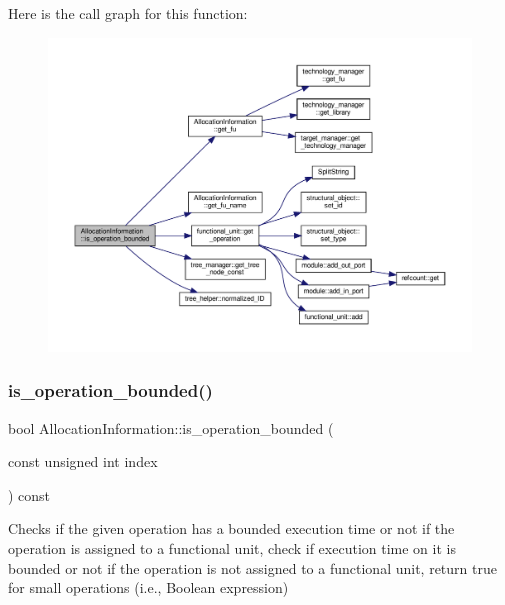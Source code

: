 Here is the call graph for this function\+:
\nopagebreak
\begin{figure}[H]
\begin{center}
\leavevmode
\includegraphics[width=350pt]{d7/d79/classAllocationInformation_a3cd743252fc29a899a2079e03792515b_cgraph}
\end{center}
\end{figure}
\mbox{\label{classAllocationInformation_a852be192e7a71d94c235d38dfc3dd96d}} 
\subsubsection{\texorpdfstring{is\+\_\+operation\+\_\+bounded()}{is\_operation\_bounded()}\hspace{0.1cm}{\footnotesize\ttfamily [3/3]}}
{\footnotesize\ttfamily bool Allocation\+Information\+::is\+\_\+operation\+\_\+bounded (\begin{DoxyParamCaption}\item[{const unsigned int}]{index }\end{DoxyParamCaption}) const}



Checks if the given operation has a bounded execution time or not if the operation is assigned to a functional unit, check if execution time on it is bounded or not if the operation is not assigned to a functional unit, return true for small operations (i.\+e., Boolean expression) 


